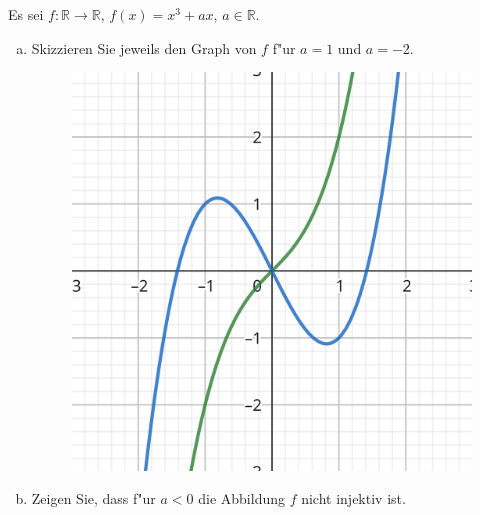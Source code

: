 \documentclass[10pt, oneside]{article}
\begin{document}
Es sei $f : \mathbb{R} \rightarrow \mathbb{R}$, $f(x) = x^3 + ax$, $a \in \mathbb{R}$.

\begin{enumerate}[(a)]
    \item Skizzieren Sie jeweils den Graph von $f$ f"ur $a = 1$ und $a = -2$.

        \begin{figure}[h]
            \centering
            \includegraphics{./assets/16-a.png}
        \end{figure}

    \item Zeigen Sie, dass f"ur $a < 0$ die Abbildung $f$ nicht injektiv ist.


\end{enumerate}
\end{document}
